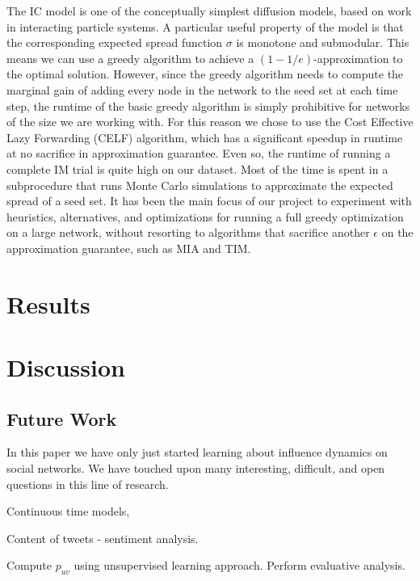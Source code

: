 \documentclass[sigconf]{acmart}
\begin{document}
The IC model is one of the conceptually simplest diffusion models, based on work in interacting particle systems. A particular useful property of the model is that the corresponding expected spread function $\sigma$ is monotone and submodular. This means we can use a greedy algorithm to achieve a $(1 - 1/e)$-approximation to the optimal solution. However, since the greedy algorithm needs to compute the marginal gain of adding every node in the network to the seed set at each time step, the runtime of the basic greedy algorithm is simply prohibitive for networks of the size we are working with. For this reason we chose to use the Cost Effective Lazy Forwarding (CELF) algorithm, which has a significant speedup in runtime at no sacrifice in approximation guarantee. Even so, the runtime of running a complete IM trial is quite high on our dataset. Most of the time is spent in a subprocedure that runs Monte Carlo simulations to approximate the expected spread of a seed set. It has been the main focus of our project to experiment with heuristics, alternatives, and optimizations for running a full greedy optimization on a large network, without resorting to algorithms that sacrifice another $\epsilon$ on the approximation guarantee, such as MIA and TIM.

\section{Results} 

\section{Discussion}

\subsection{Future Work}

In this paper we have only just started learning about influence dynamics on social networks. We have touched upon many interesting, difficult, and open questions in this line of research. 

Continuous time models, 

Content of tweets - sentiment analysis. 

Compute $p_{uv}$ using unsupervised learning approach. Perform evaluative analysis. 

\nocite{*}


\end{document}
